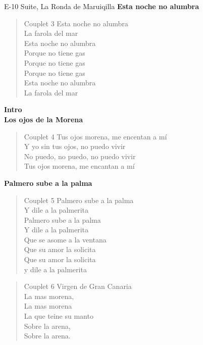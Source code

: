 \begin{song}[vals]{E-10 Suite, La Ronda de Maruiqilla}
\textbf{Esta noche no alumbra}\\

\begin{verse}{Couplet 3}
\chord{}Esta noche no alumbra\\
La farola del mar\\
\chord{}Esta noche no alumbra\\
Porque no tiene gas\\
\chord{}Porque no tiene gas\\
\chord{}Porque no tiene gas\\
\chord{}Esta noche no alumbra\\
La farola del mar\\
\end{verse}
\textbf{Intro}\\
\vspace{1em}
\textbf{Los ojos de la Morena}\\
\begin{verse}{Couplet 4}
Tus ojos morena, me encentan a mí\\
\chord{}Y yo sin tus ojos, no puedo vivir \\
No puedo, no puedo, no puedo vivir\\
\chord{}Tus ojos morena, me encantan a mí\\
\end{verse}

\vspace{1em}
\textbf{Palmero sube a la palma}\\

\begin{verse}{Couplet 5}
Palmero sube a la palma\\
Y dile a la palmerita\\
Palmero sube a la palma\\
Y dile a la palmerita\\
Que se asome a la ventana\\
Que su amor la solicita\\
Que su amor la solicita\\
y dile a la palmerita\\
\end{verse}

\begin{verse}{Couplet 6}
Virgen de Gran Cana\chord{}ria\\
\chord{}La mas morena,\\
La mas morena\\
La que teine su manto\\
\chord{}Sobre la arena,\\
Sobre la arena.\
\end{verse}


\end{song}
